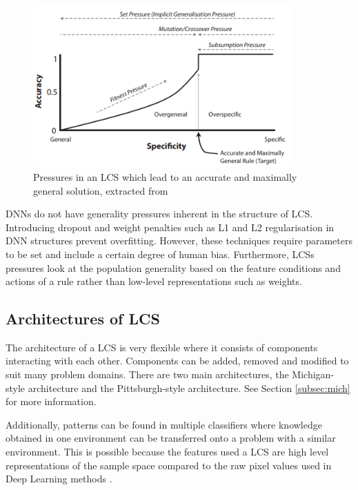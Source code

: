 \begin{figure}
	\begin{center}
		\includegraphics[width=100mm, scale=0.5]{LCSpressures.png}
		\caption{Pressures in an LCS which lead to an accurate and maximally general solution, extracted from \cite{urbanowicz2017introduction}}
		\label{fig:pressureGraph}
	\end{center}
	
\end{figure}

DNNs do not have generality pressures inherent in the structure of LCS. Introducing dropout \cite{srivastava2014dropout} and weight penalties such as L1 and L2 regularisation  \cite{srivastava2014dropout} in DNN structures prevent overfitting. However, these techniques require parameters to be set and include a certain degree of human bias. Furthermore, LCSs pressures look at the population generality based on the feature conditions and actions of a rule rather than low-level representations such as weights. 

\subsection{Architectures of LCS}

The architecture of a LCS is very flexible where it consists of components interacting with each other.  Components can be added, removed and modified to suit many problem domains. There are two main architectures, the Michigan-style architecture and the Pittsburgh-style architecture. See Section \ref{subsec:mich} for more information. 

Additionally, patterns can be found in multiple classifiers where knowledge obtained in one environment can be transferred onto a problem with a similar environment. This is possible because the features used a LCS are high level representations of the sample space compared to the raw pixel values used in Deep Learning methods \cite{zang2015learning}.

